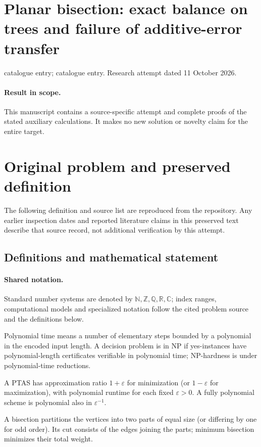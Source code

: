 \documentclass[11pt]{article}
\begin{document}
\section*{Planar bisection: exact balance on trees and failure of additive-error transfer}
\noindent catalogue entry; catalogue entry. Research attempt dated 11 October 2026.
\paragraph{Result in scope.}This manuscript contains a source-specific attempt and complete proofs of the stated auxiliary calculations. It makes no new solution or novelty claim for the entire target.
\section{Original problem and preserved definition}
The following definition and source list are reproduced from the repository. Any earlier inspection dates and reported literature claims in this preserved text describe that source record, not additional verification by this attempt.
\subsection{Definitions and mathematical statement}

\paragraph{Shared notation.}Standard number systems are denoted by $\mathbb N,\mathbb Z,\mathbb Q,\mathbb R,\mathbb C$; index ranges, computational models and specialized notation follow the cited problem source and the definitions below.


Polynomial time means a number of elementary steps bounded by a polynomial in the encoded input length. A decision problem is in $\mathrm{NP}$ if yes-instances have polynomial-length certificates verifiable in polynomial time; NP-hardness is under polynomial-time reductions.

A PTAS has approximation ratio $1+\varepsilon$ for minimization (or $1-\varepsilon$ for maximization), with polynomial runtime for each fixed $\varepsilon>0$. A fully polynomial scheme is polynomial also in $\varepsilon^{-1}$.

A bisection partitions the vertices into two parts of equal size (or differing by one for odd order). Its cut consists of the edges joining the parts; minimum bisection minimizes their total weight.
\end{document}
